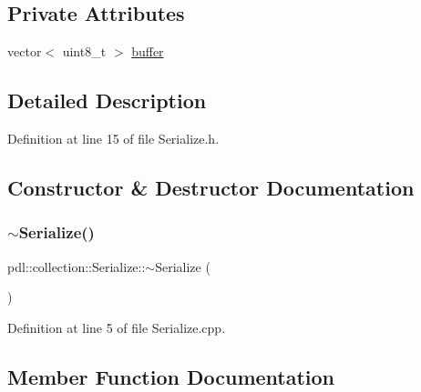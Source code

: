 \subsection*{Private Attributes}
\begin{DoxyCompactItemize}
\item 
vector$<$ uint8\+\_\+t $>$ \mbox{\hyperlink{classpdl_1_1collection_1_1_serialize_a133ff59777261b053c59d77129bc26db}{buffer}}
\end{DoxyCompactItemize}


\subsection{Detailed Description}


Definition at line 15 of file Serialize.\+h.



\subsection{Constructor \& Destructor Documentation}
\mbox{\label{classpdl_1_1collection_1_1_serialize_a4f6d989d69d62fbc73b7ed82473f564c}} 
\subsubsection{\texorpdfstring{$\sim$Serialize()}{~Serialize()}}
{\footnotesize\ttfamily pdl\+::collection\+::\+Serialize\+::$\sim$\+Serialize (\begin{DoxyParamCaption}{ }\end{DoxyParamCaption})}



Definition at line 5 of file Serialize.\+cpp.


\begin{DoxyCode}{0}

\end{DoxyCode}


\subsection{Member Function Documentation}
\mbox{\label{classpdl_1_1collection_1_1_serialize_a94131e5451258df6425175bf3459e497}} 
